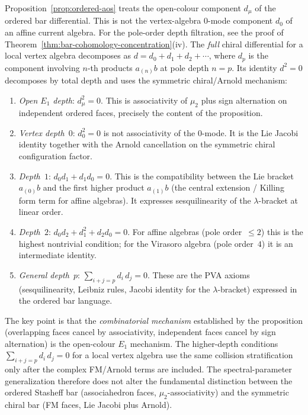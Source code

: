 \begin{remark}[Depth decomposition of $d^2=0$]
\label{rem:depth-decomposition-d-squared}
Proposition~\ref{prop:ordered-aos} treats the open-colour component
\(d_\mu\) of the ordered bar differential.  This
is not the vertex-algebra \(0\)-mode component \(d_0\) of an affine
current algebra.  For the pole-order depth filtration, see the proof
of Theorem~\ref{thm:bar-cohomology-concentration}(iv).  The
\emph{full} chiral differential for a local vertex algebra decomposes
as \(d=d_0+d_1+d_2+\cdots\),
where \(d_p\) is the component involving \(n\)-th products
\(a_{(n)}b\) at pole depth \(n=p\).  Its identity \(d^2=0\) decomposes
by total depth and uses the symmetric chiral/Arnold mechanism:
\begin{enumerate}[label=\textup{(\roman*)}]
\item \emph{Open \(E_1\) depth}: \(d_\mu^2=0\). This is associativity
 of \(\mu_2\) plus sign alternation on independent ordered faces,
 precisely the content of the proposition.
\item \emph{Vertex depth~$0$}: \(d_0^2=0\) is not associativity of the
 \(0\)-mode.  It is the Lie Jacobi identity together with the Arnold
 cancellation on the symmetric chiral configuration factor.
\item \emph{Depth~$1$}: $d_0 d_1+d_1 d_0=0$. This is
 the compatibility between the Lie bracket $a_{(0)}b$ and
 the first higher product $a_{(1)}b$ (the central extension /
 Killing form term for affine algebras). It expresses
 sesquilinearity of the $\lambda$-bracket at linear order.
\item \emph{Depth~$2$}: $d_0 d_2+d_1^2+d_2 d_0=0$.
 For affine algebras (pole order~$\le 2$) this is the
 highest nontrivial condition; for the Virasoro algebra
 (pole order~$4$) it is an intermediate identity.
\item \emph{General depth~$p$}:
 $\sum_{i+j=p}d_i\,d_j=0$.
 These are the PVA axioms (sesquilinearity, Leibniz rules,
 Jacobi identity for the $\lambda$-bracket) expressed in
 the ordered bar language.
\end{enumerate}
The key point is that the \emph{combinatorial mechanism}
established by the proposition (overlapping faces cancel by
associativity, independent faces cancel by sign
alternation) is the open-colour \(E_1\) mechanism.  The higher-depth
conditions \(\sum_{i+j=p}d_i\,d_j=0\) for a local vertex algebra use
the same collision stratification only after the complex FM/Arnold
terms are included.  The spectral-parameter generalization therefore
does not alter the fundamental distinction between the ordered
Stasheff bar (associahedron faces, \(\mu_2\)-associativity) and the
symmetric chiral bar (FM faces, Lie Jacobi plus Arnold).
\end{remark}

